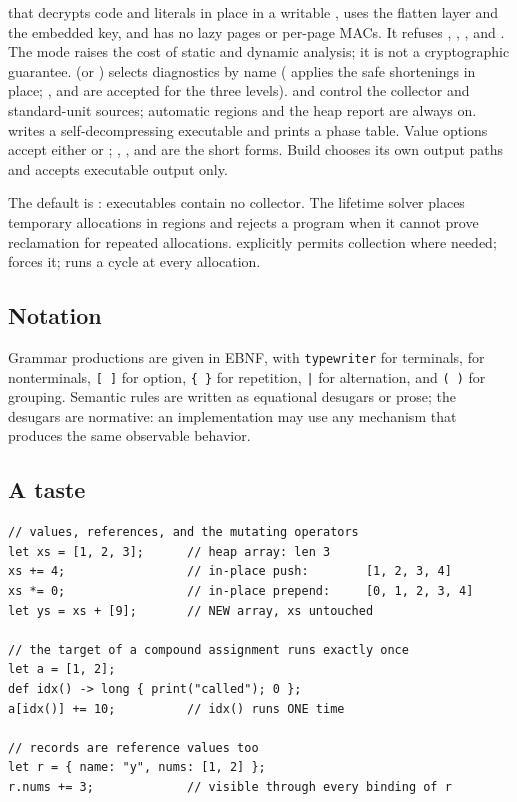 that decrypts code and literals in place in a writable , uses the
flatten layer and the embedded key, and has no lazy pages or per-page MACs.
It refuses , , ,  and . The mode raises the cost of static and
dynamic analysis; it is not a cryptographic guarantee.
 (or ) selects diagnostics
by name ( applies the safe shortenings in place; ,  and
 are accepted for the three levels).  and
 control the collector and standard-unit sources;
automatic regions and the heap report are always on.  writes a self-decompressing executable and
 prints a phase table. Value options accept either
 or ; , ,  and 
are the short forms. Build chooses its own output paths and accepts executable output
only.

The default is : executables contain no collector. The
lifetime solver places temporary allocations in regions and rejects a
program when it cannot prove reclamation for repeated allocations.
 explicitly permits collection where needed;
 forces it;  runs a cycle at every allocation.

\subsection*{Notation}

Grammar productions are given in EBNF, with
\texttt{typewriter} for terminals,  for nonterminals,
\texttt{[~]} for option, \texttt{\{~\}} for repetition,
\texttt{|} for alternation, and \texttt{(~)} for grouping.
Semantic rules are written as equational desugars or prose; the desugars
are normative: an implementation may use any mechanism that produces the
same observable behavior.

\subsection*{A taste}

\begin{lstlisting}
// values, references, and the mutating operators
let xs = [1, 2, 3];      // heap array: len 3
xs += 4;                 // in-place push:        [1, 2, 3, 4]
xs *= 0;                 // in-place prepend:     [0, 1, 2, 3, 4]
let ys = xs + [9];       // NEW array, xs untouched

// the target of a compound assignment runs exactly once
let a = [1, 2];
def idx() -> long { print("called"); 0 };
a[idx()] += 10;          // idx() runs ONE time

// records are reference values too
let r = { name: "y", nums: [1, 2] };
r.nums += 3;             // visible through every binding of r
\end{lstlisting}
